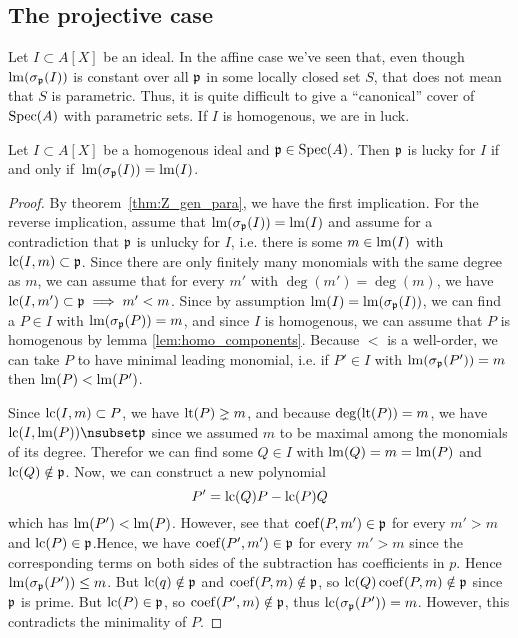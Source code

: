 \subsection{The projective case}
Let $I \subset A[X]$ be an ideal. In the affine case we've seen that, even though $\operatorname{lm}(\sigma_{\mathfrak p}(I))$ is constant over all $\mathfrak p$ in some locally closed set $S$, that does not mean that $S$ is parametric. Thus, it is quite difficult to give a ``canonical'' cover of $\operatorname{Spec}(A)$ with parametric sets. If $I$ is homogenous, we are in luck.

\begin{theorem}\label{thm:homo_lucky_iff_lm}
  Let $I \subset A[X]$ be a homogenous ideal and $\mathfrak p \in \operatorname{Spec}(A)$. Then $\mathfrak p$ is lucky for $I$ if and only if $\,\operatorname{lm}(\sigma_{\mathfrak p}(I)) = \operatorname{lm}(I)$.
\end{theorem}
\begin{proof}
  By theorem~\ref{thm:Z_gen_para}, we have the first implication. For the reverse implication, assume that $\operatorname{lm}(\sigma_{\mathfrak p}(I)) = \operatorname{lm}(I)$ and assume for a contradiction that $\mathfrak p$ is unlucky for $I$, i.e. there is some $m \in \operatorname{lm}(I)$ with $\operatorname{lc}(I, m) \subset \mathfrak p$. Since there are only finitely many monomials with the same degree as $m$, we can assume that for every $m'$ with $\deg(m') = \deg(m)$, we have $\operatorname{lc}(I, m') \subset \mathfrak p \implies m' < m$. Since by assumption $\operatorname{lm}(I) = \operatorname{lm}(\sigma_{\mathfrak p}(I))$, we can find a $P \in I$ with $\operatorname{lm}(\sigma_{\mathfrak p}(P)) = m$, and since $I$ is homogenous, we can assume that $P$ is homogenous by lemma \ref{lem:homo_components}. Because $<$ is a well-order, we can take $P$ to have minimal leading monomial, i.e. if $P' \in I$ with $\operatorname{lm}(\sigma_{\mathfrak p}(P')) = m$ then $\operatorname{lm}(P) < \operatorname{lm}(P')$.

  Since $\operatorname{lc}(I, m) \subset P$, we have $\operatorname{lt}(P) \gneq m$, and because $\deg(\operatorname{lt}(P)) = m$, we have $\LC(I, \LM(P)) \nsubset \p$ since we assumed $m$ to be maximal among the monomials of its degree. Therefor we can find some $Q \in I$ with $\operatorname{lm}(Q) = m = \operatorname{lm}(P)$ and $\operatorname{lc}(Q) \notin \mathfrak p$. Now, we can construct a new polynomial
  \[P' = \operatorname{lc}(Q)P - \operatorname{lc}(P) Q\]
  which has $\operatorname{lm}(P') < \operatorname{lm}(P)$. However, see that $\operatorname{coef}(P, m') \in \mathfrak p$ for every $m' > m$ and $\operatorname{lc}(P) \in \mathfrak p$.Hence, we have $\operatorname{coef}(P', m') \in \mathfrak p$ for every $m' > m$ since the corresponding terms on both sides of the subtraction has coefficients in $p$. Hence $\operatorname{lm}(\sigma_{\mathfrak p}(P')) \leq m$. But $\operatorname{lc}(q) \notin \mathfrak p$ and $\operatorname{coef}(P, m) \notin \mathfrak p$, so $\operatorname{lc}(Q)\operatorname{coef}(P, m) \notin \mathfrak p$ since $\mathfrak p$ is prime. But $\operatorname{lc}(P) \in \mathfrak p$, so $\operatorname{coef}(P', m) \notin \mathfrak p$, thus $\operatorname{lc}(\sigma_{\mathfrak p}(P')) = m$. However, this contradicts the minimality of $P$.
\end{proof}

